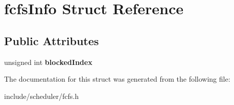 \hypertarget{structfcfsInfo}{\section{fcfs\-Info \-Struct \-Reference}
\label{d5/d4c/structfcfsInfo}
}
\subsection*{\-Public \-Attributes}
\begin{DoxyCompactItemize}
\item 
\hypertarget{structfcfsInfo_a994331c8dd9b432273d61e44e17807fd}{unsigned int {\bfseries blocked\-Index}}\label{d5/d4c/structfcfsInfo_a994331c8dd9b432273d61e44e17807fd}

\end{DoxyCompactItemize}


\-The documentation for this struct was generated from the following file\-:\begin{DoxyCompactItemize}
\item 
include/scheduler/fcfs.\-h\end{DoxyCompactItemize}
